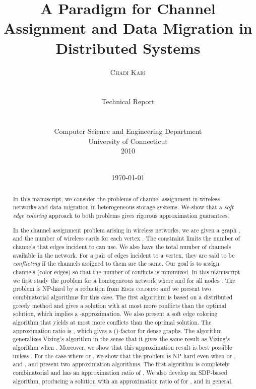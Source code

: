 \documentclass[titlepage, 11pt]{article}
\title{ A Paradigm for Channel Assignment  and Data Migration  in Distributed Systems}
\author{\textsc{Chadi Kari}\\ \\ 
\\Technical Report
\\
\\
\\
Computer Science and Engineering Department \\ University of Connecticut\\
2010
\date{}
\\}
\date{\today}
\begin{document}
\maketitle

\begin{abstract}
In this manuscript, we consider the problems of channel assignment in wireless networks and data migration in heterogeneous storage systems. We show that a  \emph{soft edge coloring} approach to both problems  gives rigorous approximation guarantees. 

In the channel assignment problem arising in wireless networks, we are given a graph , and the number of wireless cards  for each vertex . The constraint  limits the number
of channels that edges incident to  can use. We also have the total number of channels  available in the network. For a pair of edges incident to a vertex, they are said to be {\em conflicting}
if the channels assigned to them are the same. Our goal is to assign channels (color edges) so that
the number of conflicts is minimized. In this manuscript we  first study the problem for a homogeneous network where  and  for all nodes .  The problem is NP-hard by a reduction from \textsc{Edge coloring} and
we present two combinatorial algorithms for this case.
The first algorithm is based on a distributed greedy method and 
gives a solution with at most  more conflicts than the optimal solution,
which implies a -approximation. 
We also present a soft edge coloring algorithm that  yields at most  more conflicts than the optimal solution.  The approximation ratio is , which gives a ()-factor for dense graphs.  The algorithm generalizes Vizing's algorithm in the sense that it gives the same result as Vizing's algorithm when . Moreover, we show that this approximation result is best possible unless . For the case where  or ,
we show that the problem is NP-hard even when  or , and , and present two approximation algorithms. The first algorithm is completely combinatorial and has an approximation ratio of .  We also develop an SDP-based algorithm, producing a solution with an approximation ratio of  for , and  in general.
   

\end{abstract}
\end{document}
